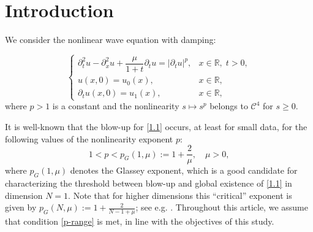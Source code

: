 \documentclass[
  sn-mathphys-num,
  colorlinks,
  linkcolor=darkmagenta,
  citecolor=rufous,
  urlcolor=zaffre,
  hypertexnames=false
]{sn-jnl}
\numberwithin{equation}{section}
\begin{document}





\maketitle


\section{Introduction}
We consider the nonlinear wave equation with damping:

\begin{equation}
\label{1.1}
\begin{cases}
\partial_t^2 u - \partial_x^2 u + \dfrac{\mu}{1 + t} \partial_t u = |\partial_t u|^p, & x \in \mathbb{R}, \; t > 0, \\
u(x, 0) = u_0(x), & x \in \mathbb{R}, \\
\partial_t u(x, 0) = u_1(x), & x \in\mathbb{R},
\end{cases}
\end{equation}
where $p > 1$ is a constant and the nonlinearity $s \mapsto s^p$ belongs to $\mathcal{C}^4$ for $s \geq 0$.

It is well-known \cite[Theorem 2.3]{HH2021} that the blow-up for \eqref{1.1} occurs, at least for small data, for the following values of the nonlinearity exponent $p$:
\begin{equation}\label{p-range}
    1< p < p_G(1, \mu) := 1 + \frac{2}{\mu}, \quad \mu>0,
\end{equation}
where $p_G(1, \mu)$ denotes the Glassey exponent, which is a good candidate for characterizing the threshold between blow-up and global existence of \eqref{1.1} in dimension $N=1$. Note that for higher dimensions this ``critical'' exponent is given by $\displaystyle p_G(N, \mu) := 1 + \frac{2}{N-1+\mu}$; see e.g. \cite{HH2021}. 
Throughout this article, we assume that condition \eqref{p-range} is met, in line with the objectives of this study.
\end{document}
